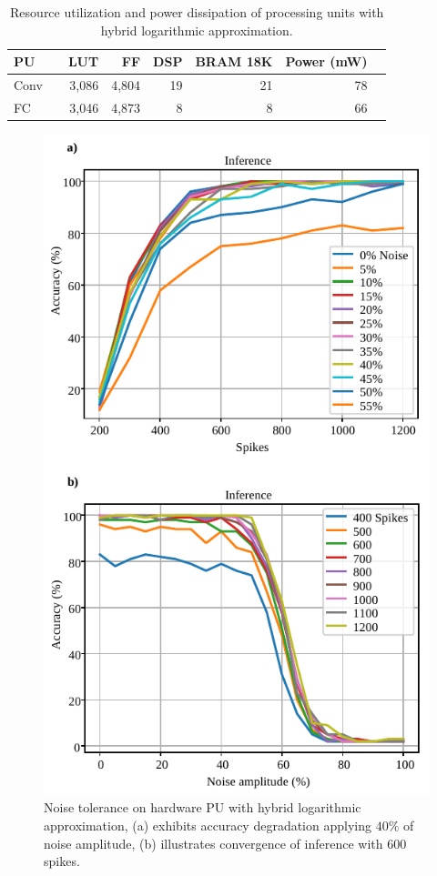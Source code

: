 \begin{table}[!h]\centering
	\caption{Resource utilization and power dissipation of processing units with hybrid logarithmic approximation.}\label{tab:resource_log}
	\scriptsize
\begin{tabular}{lrrrrrrr}\toprule
	\textbf{PU} & &\textbf{LUT} &\textbf{FF} &\textbf{DSP} &\textbf{BRAM 18K} &\textbf{Power (mW)} \\\midrule
	Conv & &3,086 &4,804 &19 &21 &78 \\
	FC & &3,046 &4,873 &8 &8 &66 \\
	\bottomrule
\end{tabular}
\end{table}

\begin{figure}[h!]
	\centering
	\includegraphics[width=1\columnwidth]{../figures/accuracy_vs_noise_pu_log.pdf}
	\caption{Noise tolerance on hardware PU with hybrid logarithmic approximation, (a) exhibits accuracy degradation applying $40\%$ of noise amplitude, (b) illustrates convergence of inference with $600$ spikes.}
	\label{fig:accuracy_vs_noise_pu_log}
\end{figure}


